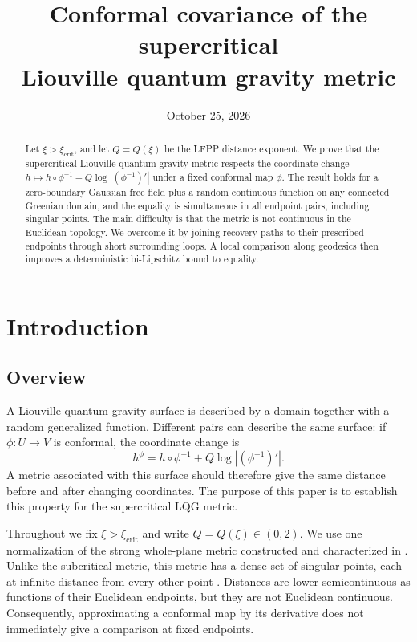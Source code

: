 \documentclass[11pt]{article}
\title{Conformal covariance of the supercritical\\Liouville quantum gravity metric}
\author{}
\date{October 25, 2026}
\theoremstyle{definition}
\theoremstyle{remark}
\newcommand{\crit}{\mathrm{crit}}
\begin{document}
\maketitle
\begin{abstract}
Let $\xi>\xi_{\crit}$, and let $Q=Q(\xi)$ be the LFPP distance
exponent. We prove that the supercritical Liouville quantum gravity
metric respects the coordinate change
$h\mapsto h\circ\phi^{-1}+Q\log|(\phi^{-1})'|$ under a fixed
conformal map $\phi$. The result holds for a zero-boundary Gaussian
free field plus a random continuous function on any connected
Greenian domain, and the equality is simultaneous in all endpoint
pairs, including singular points. The main difficulty is that the
metric is not continuous in the Euclidean topology. We overcome it
by joining recovery paths to their prescribed endpoints through
short surrounding loops. A local comparison along geodesics then
improves a deterministic bi-Lipschitz bound to equality.
\end{abstract}
\section{Introduction}
\subsection{Overview}
A Liouville quantum gravity surface is described by a domain together
with a random generalized function. Different pairs can describe the
same surface: if $\phi:U\to V$ is conformal, the coordinate change is
\begin{equation}\label{eq:field-change}
 h^\phi=h\circ\phi^{-1}+Q\log|(\phi^{-1})'|.
\end{equation}
A metric associated with this surface should therefore give the same
distance before and after changing coordinates. The purpose of this
paper is to establish this property for the supercritical LQG metric.

Throughout we fix $\xi>\xi_{\crit}$ and write $Q=Q(\xi)\in(0,2)$.
We use one normalization of the strong whole-plane metric constructed
and characterized in \cite{DG}. Unlike the subcritical metric, this
metric has a dense set of singular points, each at infinite distance
from every other point \cite{Pfeffer}. Distances are lower
semicontinuous as functions of their Euclidean endpoints, but they
are not Euclidean continuous. Consequently, approximating a
conformal map by its derivative does not immediately give a
comparison at fixed endpoints.
\end{document}
